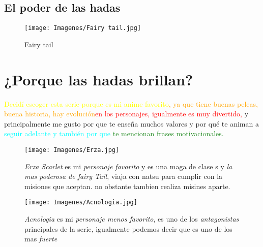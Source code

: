 \documentclass[a5paper,11pt]{article}
\begin{document}
\subsection {El poder de las hadas}
\begin{figure}[h]
 \raggedleft
      \caption*{ Fairy tail}
      \texttt{[image: Imagenes/Fairy tail.jpg]}
      \end{figure}
\section{¿Porque las hadas brillan?}
{\textcolor{Yellow}{Decidí escoger esta serie porque es mi anime favorito}}{\textcolor{orange}{, ya que tiene buenas peleas, buena historia, hay evolución}{\textcolor{red}{en los personajes, igualmente es muy divertido,}}} {\textcolor{Rhodamine}{y principalmente me gusto por que te}}  {\textcolor{Mulberry}{enseña muchos {\huge valores} y por qué te animan a}} {{\textcolor{cyan}{{\huge seguir adelante} y también por que}}} {{\textcolor{ForestGreen}{te mencionan {{\huge frases motivacionales.}}}}}
\begin{SCfigure}[0.999][ht]
     \raggedright
     \texttt{[image: Imagenes/Erza.jpg]}
     \caption{\small{{{\textit {Erza Scarlet}}  es mi {\textit{personaje favorito}} y es una maga de clase s y  {\textit {la mas poderosa de fairy Tail}}, viaja con natsu para cumplir con la misiones que aceptan. no obstante tambien realiza misines aparte.}}}
     \label{fig:my_label} 
 \end{SCfigure}
 
\begin{SCfigure}[0.9][ht]
     \raggedright
     \texttt{[image: Imagenes/Acnologia.jpg]}
     \caption{\small{{{\textit {Acnologia}} es mi {\textit {personaje menos favorito}}, es uno de  los {\textit {antagonistas}} principales de la serie, igualmente podemos decir que es uno de los mas {\textit {fuerte}}}}}
     \label{fig:my_label} 
 \end{SCfigure}



\end{document}

